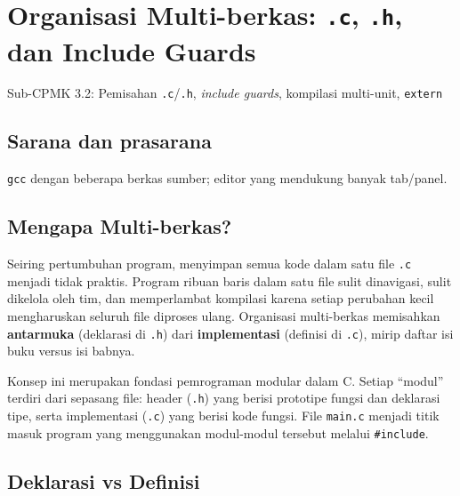 \documentclass[../main.tex]{subfiles}
\begin{document}
\chapter{Organisasi Multi-berkas: \texttt{.c}, \texttt{.h}, dan Include Guards}

\begin{subcpmk}
  \item Sub-CPMK 3.2: Pemisahan \texttt{.c}/\texttt{.h}, \textit{include guards}, kompilasi multi-unit, \texttt{extern}
\end{subcpmk}


\section{Sarana dan prasarana}
\texttt{gcc} dengan beberapa berkas sumber; editor yang mendukung banyak tab/panel.

\section{Mengapa Multi-berkas?}

Seiring pertumbuhan program, menyimpan semua kode dalam satu file \texttt{.c} menjadi tidak praktis. Program ribuan baris dalam satu file sulit dinavigasi, sulit dikelola oleh tim, dan memperlambat kompilasi karena setiap perubahan kecil mengharuskan seluruh file diproses ulang. Organisasi multi-berkas memisahkan \textbf{antarmuka} (deklarasi di \texttt{.h}) dari \textbf{implementasi} (definisi di \texttt{.c}), mirip daftar isi buku versus isi babnya.

Konsep ini merupakan fondasi pemrograman modular dalam C. Setiap ``modul'' terdiri dari sepasang file: header (\texttt{.h}) yang berisi prototipe fungsi dan deklarasi tipe, serta implementasi (\texttt{.c}) yang berisi kode fungsi. File \texttt{main.c} menjadi titik masuk program yang menggunakan modul-modul tersebut melalui \texttt{\#include}.

\section{Deklarasi vs Definisi}
\end{document}
